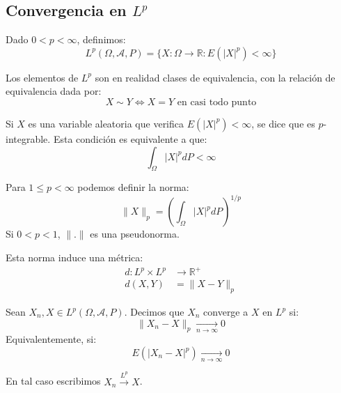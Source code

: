 \subsection*{Convergencia en $L^p$}
Dado $0 < p < \infty$, definimos:
$$L^p(\Omega, \mathcal{A}, P) = \{X: \Omega \to \mathbb{R} : E(|X|^p) < \infty\}$$

\begin{note}
    Los elementos de $L^p$ son en realidad clases de equivalencia, con la relación de equivalencia dada por:
    $$X \sim Y \Leftrightarrow X = Y \text{ en casi todo punto}$$
\end{note}

\begin{note}
    Si $X$ es una variable aleatoria que verifica $E(|X|^p) < \infty$, se dice que es $p$-integrable.
    Esta condición es equivalente a que:
    $$\int_\Omega |X|^p dP < \infty$$
\end{note}

Para $1 \leq p < \infty$ podemos definir la norma:
$$\|X\|_p = \left(\int_\Omega |X|^p dP\right)^{1/p}$$
Si $0 < p < 1$, $\|.\|$ es una pseudonorma.

Esta norma induce una métrica:
\begin{align*}
    d: L^p \times L^p & \to \mathbb{R}^+ \\
    d(X, Y)           & = \|X-Y\|_p
\end{align*}

\begin{definition}
    Sean $X_n, X \in L^p(\Omega, \mathcal{A}, P)$.
    Decimos que $X_n$ converge a $X$ en $L^p$ si:
    $$\|X_n - X\|_p \xrightarrow[n \to \infty]{} 0$$
    Equivalentemente, si:
    $$E(|X_n - X|^p) \xrightarrow[n \to \infty]{} 0$$

    En tal caso escribimos $X_n \xrightarrow{L^p} X$.
\end{definition}

